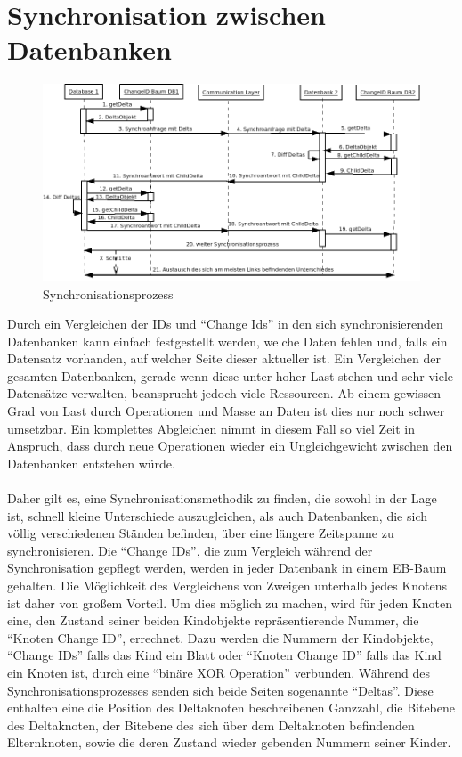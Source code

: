 \documentclass[a4paper,11pt,oneside,%
headsepline,												%
footsepline,												%
bibtotocnumbered									%
]{scrreprt}
\begin{document}
\section{Synchronisation zwischen Datenbanken}
\label{sec:eBTreeSynchronisation}
\begin{figure}[h!]
        \centering
    \includegraphics[width=1\textwidth]{bilder/SynchroProzess.png}
    \caption{Synchronisationsprozess}
\end{figure}
Durch ein Vergleichen der \ac{ID}s und \enquote{Change Ids} in den sich synchronisierenden Datenbanken kann einfach festgestellt werden, welche Daten fehlen und, falls ein Datensatz vorhanden, auf welcher Seite dieser aktueller ist. Ein Vergleichen der gesamten Datenbanken, gerade wenn diese unter hoher Last stehen und sehr viele Datensätze verwalten, beansprucht jedoch viele Ressourcen. Ab einem gewissen Grad von Last durch Operationen und Masse an Daten ist dies nur noch schwer umsetzbar. Ein komplettes Abgleichen nimmt in diesem Fall so viel Zeit in Anspruch, dass durch neue Operationen wieder ein Ungleichgewicht zwischen den Datenbanken entstehen würde.\\\\
Daher gilt es, eine Synchronisationsmethodik zu finden, die sowohl in der Lage ist, schnell kleine Unterschiede auszugleichen, als auch Datenbanken, die sich völlig verschiedenen Ständen befinden, über eine längere Zeitspanne zu synchronisieren.
Die \enquote{Change IDs}, die zum Vergleich während der Synchronisation gepflegt werden, werden in jeder Datenbank in einem \ac{EB-Baum} gehalten. Die Möglichkeit des Vergleichens von Zweigen unterhalb jedes Knotens ist daher von großem Vorteil. Um dies möglich zu machen, wird für jeden Knoten eine, den Zustand seiner beiden Kindobjekte repräsentierende Nummer, die \enquote{Knoten Change ID}, errechnet.
 Dazu werden die Nummern der Kindobjekte, \enquote{Change IDs} falls das Kind ein Blatt oder \enquote{Knoten Change ID} falls das Kind ein Knoten ist, durch eine \enquote{binäre XOR Operation} verbunden. Während des Synchronisationsprozesses senden sich beide Seiten sogenannte \enquote{Deltas}. Diese enthalten eine die Position des Deltaknoten beschreibenen Ganzzahl, die Bitebene des  Deltaknoten, der Bitebene des sich über dem Deltaknoten befindenden Elternknoten, sowie die deren Zustand wieder gebenden Nummern seiner Kinder.
\end{document}
